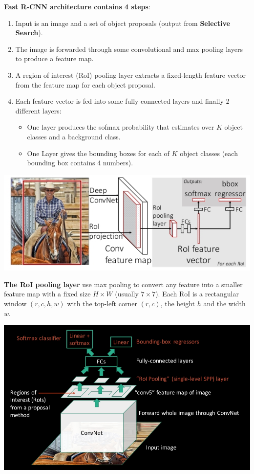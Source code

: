 \documentclass{article}
\begin{document}
\noindent \textbf{Fast R-CNN architecture contains 4 steps}:
\begin{enumerate}
	\item Input is an image and a set of object proposals (output from \textbf{Selective Search}).
	\item The image is forwarded through some convolutional and max pooling layers to produce a feature map.
	\item A region of interest (RoI) pooling layer extracts a fixed-length feature vector from the feature map for each object proposal.
	\item Each feature vector is fed into some fully connected layers and finally 2 different layers:
	\begin{itemize}
		\item	One layer produces the sofmax probability that estimates over $K$ object classes and a background class.
		\item	One Layer gives the bounding boxes for each of $K$ object classes (each bounding box contains 4 numbers).
	\end{itemize}
\end{enumerate}

\begin{center}
	\includegraphics[scale=0.5]{fast_rcnn}
\end{center}

\textbf{The RoI pooling layer} use max pooling to convert any feature into a smaller feature map with a fixed size $H \times W$ (usually $7 \times 7$).  Each RoI is a rectangular window $(r, c, h, w)$ with the top-left corner $(r, c)$, the height $h$ and the width $w$.

\begin{center}
	\includegraphics[scale=0.3]{fast_rcnn_detail}
\end{center}
\end{document}
